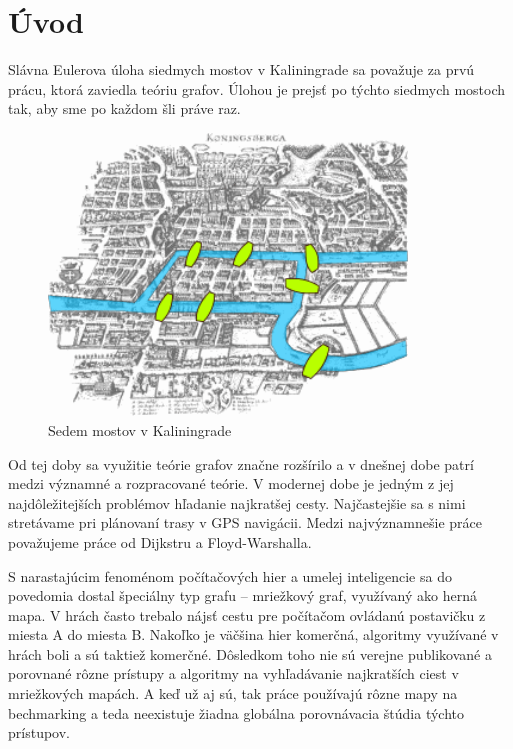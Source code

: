 \chapter*{Úvod}

Slávna Eulerova úloha siedmych mostov v Kaliningrade \cite{euler41} sa považuje za prvú prácu, 
ktorá zaviedla teóriu grafov.
Úlohou je prejsť po týchto siedmych mostoch tak, aby sme po každom šli práve raz.


\begin{figure}[h]
\centering
\includegraphics[height=7.5cm]{./img/Konigsberg_bridges.png}
\caption{Sedem mostov v Kaliningrade}
\label{fig:konigsberg_bridges}
\end{figure}


 
Od tej doby sa využitie teórie grafov značne
rozšírilo a v dnešnej dobe patrí medzi významné
a rozpracované teórie. V modernej dobe je jedným z jej 
najdôležitejších problémov hľadanie najkratšej cesty. Najčastejšie sa s nimi stretávame pri plánovaní trasy v
GPS navigácii.
Medzi najvýznamnešie práce považujeme práce od Dijkstru \cite{dijkstra59} a Floyd-Warshalla.

S narastajúcim fenoménom počítačových hier 
a umelej inteligencie sa do povedomia dostal špeciálny typ grafu --
mriežkový graf, využívaný ako herná mapa.
V hrách často trebalo nájsť cestu pre počítačom
ovládanú postavičku z miesta A do miesta B.
Nakoľko je väčšina hier komerčná, algoritmy
využívané v hrách boli a sú taktiež komerčné.
Dôsledkom toho nie sú verejne publikované a porovnané rôzne prístupy a algoritmy
na vyhľadávanie najkratších ciest v mriežkových mapách. A keď už aj sú, tak práce používajú rôzne mapy
na bechmarking a teda neexistuje žiadna globálna porovnávacia štúdia týchto prístupov.

